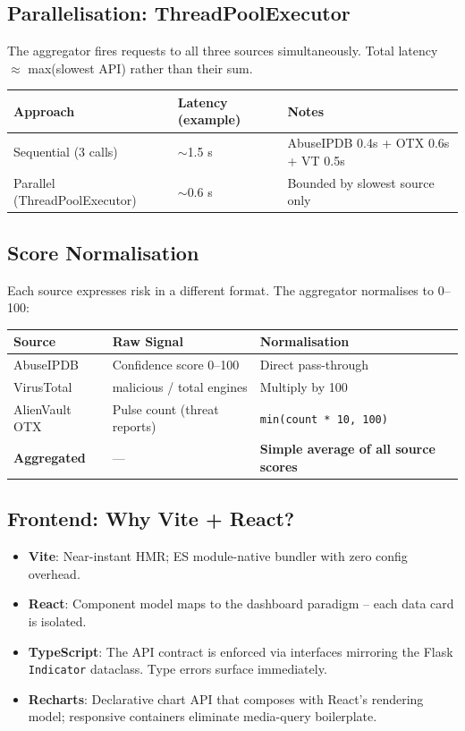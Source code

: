 \documentclass[11pt,a4paper]{article}
\begin{document}
\subsection{Parallelisation: ThreadPoolExecutor}

The aggregator fires requests to all three sources simultaneously. Total latency $\approx$ max(slowest API) rather than their sum.

\begin{center}
\small
\begin{tabular}{lll}
\toprule
\textbf{Approach} & \textbf{Latency (example)} & \textbf{Notes} \\
\midrule
Sequential (3 calls) & $\sim$1.5 s & AbuseIPDB 0.4s + OTX 0.6s + VT 0.5s \\
Parallel (ThreadPoolExecutor) & $\sim$0.6 s & Bounded by slowest source only \\
\bottomrule
\end{tabular}
\end{center}

\subsection{Score Normalisation}

Each source expresses risk in a different format. The aggregator normalises to 0--100:

\begin{center}
\begin{tabular}{lll}
\toprule
\textbf{Source} & \textbf{Raw Signal} & \textbf{Normalisation} \\
\midrule
AbuseIPDB      & Confidence score 0--100 & Direct pass-through \\
VirusTotal     & malicious / total engines & Multiply by 100 \\
AlienVault OTX & Pulse count (threat reports) & \texttt{min(count * 10, 100)} \\
\midrule
\textbf{Aggregated} & --- & \textbf{Simple average of all source scores} \\
\bottomrule
\end{tabular}
\end{center}

\subsection{Frontend: Why Vite + React?}

\begin{itemize}
  \item \textbf{Vite}: Near-instant HMR; ES module-native bundler with zero config overhead.
  \item \textbf{React}: Component model maps to the dashboard paradigm -- each data card is isolated.
  \item \textbf{TypeScript}: The API contract is enforced via interfaces mirroring the Flask \texttt{Indicator} dataclass. Type errors surface immediately.
  \item \textbf{Recharts}: Declarative chart API that composes with React's rendering model; responsive containers eliminate media-query boilerplate.
\end{itemize}
\end{document}
